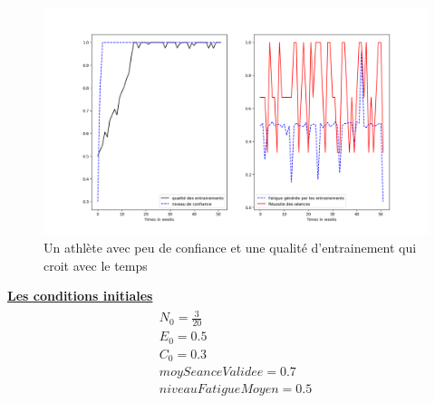 \documentclass[
]{article}
\begin{document}
		\begin{figure}[H]
			\centering
			\includegraphics[width=\textwidth]{Graph2SImu2}
			\caption{Un athlète avec peu de confiance et une qualité d'entrainement qui croit avec le temps}
			\label{fig:2_2}
		\end{figure}
		\underline{\textbf{Les conditions initiales}}
		\begin{align*}
			\boxed{\begin{array}{c} N_0=\frac{3}{20} \\ E_0=0.5 \\
					C_0=0.3 \\
					moySeanceValidee=0.7 \\
					niveauFatigueMoyen=0.5
			\end{array}}
		\end{align*}		
\end{document}
